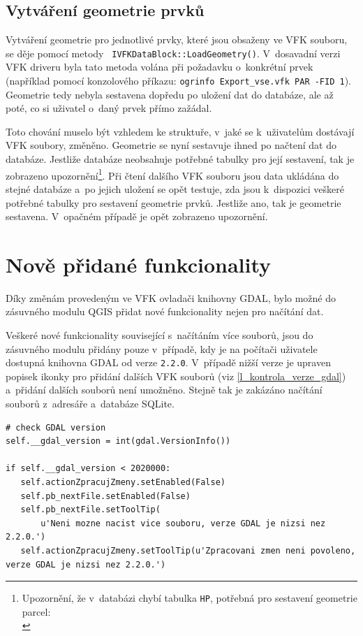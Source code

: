 \documentclass[a4paper,12pt,oneside]{book}
\begin{document}
\subsection{Vytváření geometrie prvků}
Vytváření geometrie pro jednotlivé prvky, které jsou obsaženy ve VFK
souboru, se děje pomocí metody \texttt{
  IVFKDataBlock::LoadGeometry()}. V~dosavadní verzi VFK driveru byla
tato metoda volána při požadavku o~konkrétní prvek (například pomocí
konzolového příkazu: \texttt{ogrinfo Export\_vse.vfk PAR -FID
  1}). Geometrie tedy nebyla sestavena dopředu po uložení dat do
databáze, ale až poté, co si uživatel o~daný prvek přímo zažádal.

Toto chování muselo být vzhledem ke struktuře, v~jaké se k~uživatelům
dostávají VFK soubory, změněno. Geometrie se nyní sestavuje ihned po
načtení dat do databáze. Jestliže databáze neobsahuje potřebné tabulky
pro její sestavení, tak je zobrazeno upozornění\footnote{Upozornění,
  že v~databázi chybí tabulka \texttt{HP}, potřebná pro sestavení
  geometrie parcel:\\}. Při čtení dalšího VFK souboru jsou data
ukládána do stejné databáze a~po jejich uložení se opět testuje, zda
jsou k~dispozici veškeré potřebné tabulky pro sestavení geometrie
prvků. Jestliže ano, tak je geometrie sestavena. V~opačném případě je
opět zobrazeno upozornění.


\clearpage
\section{Nově přidané funkcionality}
\label{l_nove_funkcionality}
Díky změnám provedeným ve VFK ovladači knihovny GDAL, bylo možné do zásuvného modulu QGIS přidat
nové funkcionality nejen pro načítání dat.

Veškeré nové funkcionality související s~načítáním více souborů, 
jsou do zásuvného modulu přidány pouze v~případě, kdy 
je na počítači uživatele dostupná knihovna GDAL od verze \texttt{2.2.0}. 
V~případě nižší verze je upraven popisek ikonky pro přidání dalších VFK 
souborů (viz \ref{l_kontrola_verze_gdal}) a~přidání dalších souborů 
není umožněno. Stejně tak je zakázáno načítání souborů z~adresáře
a~databáze SQLite.

{\scriptsize
\begin{lstlisting}[style=python, 
		    caption={Kontrola verze GDAL na straně VFK pluginu}, 
		    label=l_kontrola_verze_gdal]
# check GDAL version
self.__gdal_version = int(gdal.VersionInfo())

if self.__gdal_version < 2020000:
   self.actionZpracujZmeny.setEnabled(False)
   self.pb_nextFile.setEnabled(False)
   self.pb_nextFile.setToolTip(
       u'Neni mozne nacist vice souboru, verze GDAL je nizsi nez 2.2.0.')
   self.actionZpracujZmeny.setToolTip(u'Zpracovani zmen neni povoleno, verze GDAL je nizsi nez 2.2.0.')
\end{lstlisting}
}
\end{document}
